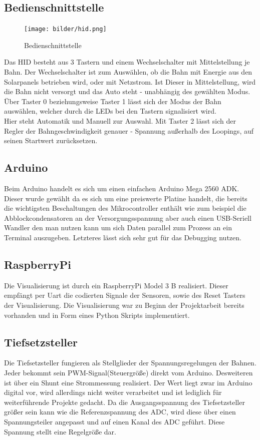 \documentclass[a4paper, 11pt]{scrartcl}
\begin{document}
	\subsection{Bedienschnittstelle}
		\begin{figure}[h]
			\centering
			\texttt{[image: bilder/hid.png]}
			\caption{Bedienschnittstelle}
			\label{img:hid}
		\end{figure}
		Das HID besteht aus 3 Tastern und einem Wechselschalter mit Mittelstellung je Bahn.
		Der Wechselschalter ist zum Auswählen, ob die Bahn mit Energie aus den Solarpanels betrieben wird, oder mit Netzstrom. Ist Dieser in Mittelstellung, wird die Bahn nicht versorgt und das Auto steht - unabhängig des gewählten Modus.
		Über Taster 0 beziehungsweise Taster 1 lässt sich der Modus der Bahn auswählen, welcher durch die LEDs bei den Tastern signalisiert wird. \\Hier steht Automatik und Manuell zur Auswahl.
		Mit Taster 2 lässt sich der Regler der Bahngeschwindigkeit genauer -  Spannung außerhalb des Loopings, auf seinen Startwert zurücksetzen.
	\subsection{Arduino}
		Beim Arduino handelt es sich um einen einfachen Arduino Mega 2560 ADK.\\
		Dieser wurde gewählt da es sich um eine preiswerte Platine handelt, die bereits die wichtigsten Beschaltungen des Mikrocontroller enthält wie zum beispiel die Abblockcondensatoren an der Versorgungsspannung aber auch einen USB-Seriell Wandler den man nutzen kann um sich Daten parallel zum Prozess an ein Terminal auszugeben.
		Letzteres lässt sich sehr gut für das Debugging nutzen.
	\subsection{RaspberryPi}
		Die Visualisierung ist durch ein RaspberryPi Model 3 B realisiert. Dieser empfängt per Uart die codierten Signale der Sensoren, sowie des Reset Tasters der Visualisierung.
		Die Visualisierung war zu Beginn der Projektarbeit bereits vorhanden und in Form eines Python Skripts implementiert.
	\subsection{Tiefsetzsteller}
		Die Tiefsetzsteller fungieren als Stellglieder der Spannungsregelungen der Bahnen. Jeder bekommt sein PWM-Signal(Steuergröße) direkt vom Arduino. Desweiteren ist über ein Shunt eine Strommessung realisiert. Der Wert liegt zwar im Arduino digital vor, wird allerdings nicht weiter verarbeitet und ist lediglich für weiterführende Projekte gedacht. Da die Ausgangsspannung des Tiefsetzsteller größer sein kann wie die Referenzspannung des ADC, wird diese über einen Spannungsteiler angepasst und auf einen Kanal des ADC geführt. Diese Spannung stellt eine Regelgröße dar.
	\newpage
\end{document}
